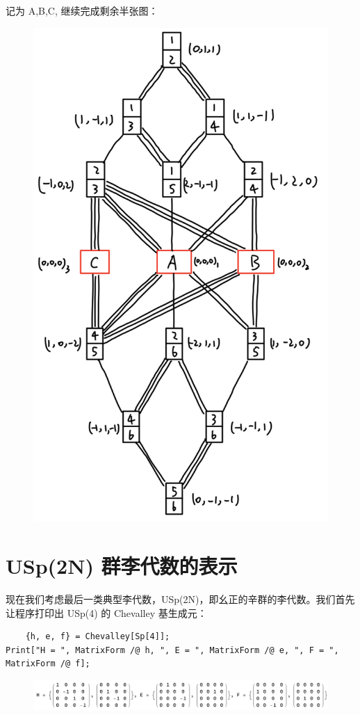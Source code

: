 \documentclass[UTF8]{ctexart}
\begin{document}
\noindent 记为 A,B,C, 继续完成剩余半张图：

\begin{figure}[H]
\begin{centering}
\includegraphics[width=0.6\linewidth]{include/T9}
\par\end{centering}
\end{figure}

\section*{USp(2N) 群李代数的表示}
\noindent 现在我们考虑最后一类典型李代数，USp(2N)，即幺正的辛群的李代数。我们首先让程序打印出 USp(4) 的 Chevalley 基生成元：
\begin{verbatim}
	{h, e, f} = Chevalley[Sp[4]];
Print["H = ", MatrixForm /@ h, ", E = ", MatrixForm /@ e, ", F = ", MatrixForm /@ f];
\end{verbatim}

\begin{figure}[H]
\begin{centering}
\includegraphics[width=0.95\linewidth]{include/O19}
\par\end{centering}
\end{figure}
\end{document}
